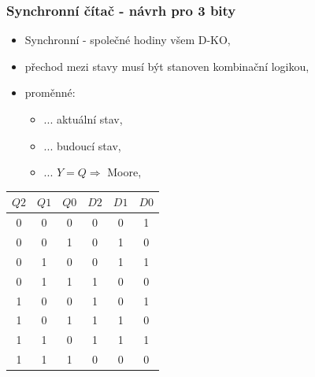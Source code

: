 	\begin{frame}
    \frametitle{Synchronní čítač - návrh pro 3 bity}
		
		\begin{minipage}[t][\textheight][t]{0.45\textwidth}
    \vspace{10mm}
    
    \begin{itemize}
      \item Synchronní - společné hodiny všem D-KO,
      \item přechod mezi stavy musí být stanoven kombinační logikou,
      \item proměnné:
      
      \begin{itemize}
        \item[$Q$] ... aktuální stav,
        \item[$D$] ... budoucí stav,
        \item[$Y$] ... $Y=Q \Rightarrow$ Moore,
      \end{itemize}
    \end{itemize}
    
		\end{minipage}
		\begin{minipage}[t][\textheight][t]{0.5\textwidth}
		\vspace{10mm}
		\begin{center}
			\begin{tabular}{ c c c | c c c }
				$Q2$ & $Q1$ & $Q0$ & $D2$ & $D1$ & $D0$\\
				\hline
				0 & 0 & 0 & 0 & 0 & 1 \\
				0 & 0 & 1 & 0 & 1 & 0 \\
				0 & 1 & 0 & 0 & 1 & 1 \\
				0 & 1 & 1 & 1 & 0 & 0 \\
        1 & 0 & 0 & 1 & 0 & 1 \\
				1 & 0 & 1 & 1 & 1 & 0 \\
				1 & 1 & 0 & 1 & 1 & 1 \\
				1 & 1 & 1 & 0 & 0 & 0 \\
			\end{tabular}
		\end{center}

		\end{minipage}
		
	\end{frame}
  
